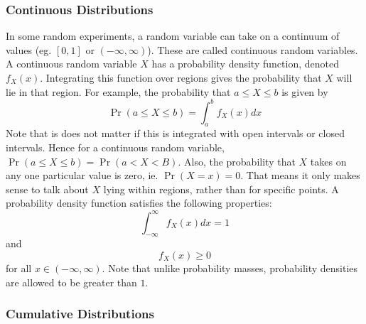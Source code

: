 \documentclass[11pt]{report} %
\begin{document}
\subsubsection{Continuous Distributions}

In some random experiments, a random variable can take on a continuum of values (eg. $\left[0, 1\right]$ or $\left(-\infty, \infty\right)$). These are called continuous random variables. A continuous random variable $X$ has a probability density function, denoted $f_{X}\left(x\right)$. Integrating this function over regions gives the probability that $X$ will lie in that region. For example, the probability that $a \leq X \leq b$ is given by
\begin{equation}
\operatorname{Pr}\left(a \leq X \leq b\right) = \int_{a}^{b}f_{X}\left(x\right)dx
\end{equation}
Note that is does not matter if this is integrated with open intervals or closed intervals. Hence for a continuous random variable, $\operatorname{Pr}\left(a \leq X \leq b\right) = \operatorname{Pr}\left(a < X < B\right)$. Also, the probability that $X$ takes on any one particular value is zero, ie. $\operatorname{Pr}\left(X = x\right) = 0$. That means it only makes sense to talk about $X$ lying within regions, rather than for specific points. A probability density function satisfies the following properties:
\begin{equation}
\int_{-\infty}^{\infty}f_{X}\left(x\right)dx = 1
\end{equation}
and
\begin{equation}
f_{X}\left(x\right) \geq 0
\end{equation}
for all $x\in\left(-\infty, \infty\right)$. Note that unlike probability masses, probability densities are allowed to be greater than $1$.

\subsubsection{Cumulative Distributions}
\end{document}
